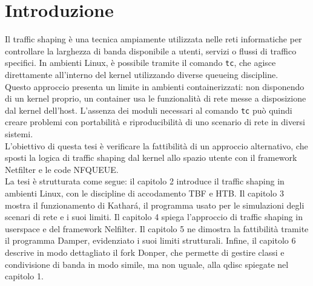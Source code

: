 \chapter{Introduzione}
Il traffic shaping è una tecnica ampiamente utilizzata nelle reti informatiche per controllare la larghezza di banda disponibile a utenti, servizi o flussi di traffico specifici. 
In ambienti Linux, è possibile tramite il comando \texttt{tc}, che agisce direttamente all'interno del kernel utilizzando diverse queueing discipline. \\
\vspace*{0.01\textheight}
Questo approccio presenta un limite in ambienti containerizzati: non disponendo di un kernel proprio, un container usa le funzionalità di rete messe a disposizione dal kernel dell'host.
L'assenza dei moduli necessari al comando \texttt{tc} può quindi creare problemi con portabilità e riproducibilità di uno scenario di rete in diversi sistemi. \\
\vspace*{0.01\textheight}
L'obiettivo di questa tesi è verificare la fattibilità di un approccio alternativo, che sposti la logica di traffic shaping dal kernel allo spazio utente con il framework Netfilter e le code NFQUEUE. \\
\vspace*{0.01\textheight}
La tesi è strutturata come segue: il capitolo 2 introduce il traffic shaping in ambienti Linux, con le discipline di accodamento TBF e HTB.
Il capitolo 3 mostra il funzionamento di Kathará, il programma usato per le simulazioni degli scenari di rete e i suoi limiti. Il capitolo 4 spiega l'approccio di traffic shaping in userspace e del framework Nelfilter. 
Il capitolo 5 ne dimostra la fattibilità tramite il programma Damper, evidenziato i suoi limiti strutturali. 
Infine, il capitolo 6 descrive in modo dettagliato il fork Donper, che permette di gestire classi e condivisione di banda in modo simile, ma non uguale, alla qdisc spiegate nel capitolo 1.
